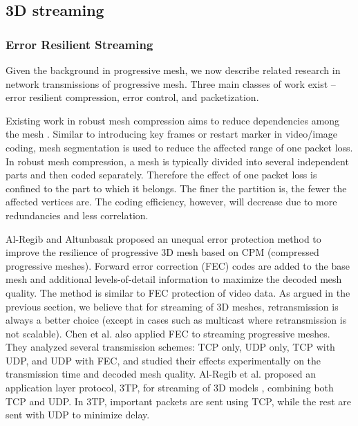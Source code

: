 \documentclass[11pt, a4paper]{report}
\begin{document}
    \subsection{3D streaming}
    \subsubsection{Error Resilient Streaming}
    Given the background in progressive mesh, we now describe
    related research in network transmissions of progressive mesh. 
    Three main classes of work exist 
    -- error resilient compression, error control, and
    packetization.

    Existing work in robust mesh compression aims to
    reduce dependencies among the mesh \cite{error:Park,error:Yan}.
    Similar to introducing key frames or restart marker in video/image
    coding, mesh
    segmentation is used to reduce the affected range of one
    packet loss. In robust mesh compression, a mesh is typically
    divided into several independent parts and then coded separately.
    Therefore the effect of one packet loss is confined to the part to which
    it belongs. The finer the partition is, the fewer the affected vertices
    are.  The coding efficiency, however, will decrease
    due to more redundancies and less correlation.

    Al-Regib and Altunbasak \cite{unequal:Al-Regib} proposed an
    unequal error protection method to improve the resilience of
    progressive 3D mesh based on CPM (compressed progressive meshes). Forward error
    correction (FEC) codes are added to the
    base mesh and additional levels-of-detail information to maximize 
    the decoded mesh quality.  The method is similar to FEC protection 
    of video data.
    As argued in the previous section, we believe that for streaming
    of 3D meshes, retransmission is always a better choice (except in
    cases such as multicast where retransmission is not scalable).
    Chen et al. \cite{chen05hybrid} also applied FEC to streaming
    progressive meshes. They analyzed several transmission schemes:
    TCP only, UDP only, TCP with UDP, and UDP with FEC, and studied
    their effects experimentally on the transmission time and decoded
    mesh quality.
    Al-Regib et al. proposed an application layer protocol, 3TP,
    for streaming of 3D models \cite{3tpregib}, combining both TCP 
    and UDP.  In 3TP, important packets are sent using
    TCP, while the rest are sent with UDP to minimize delay.
    
\end{document}
